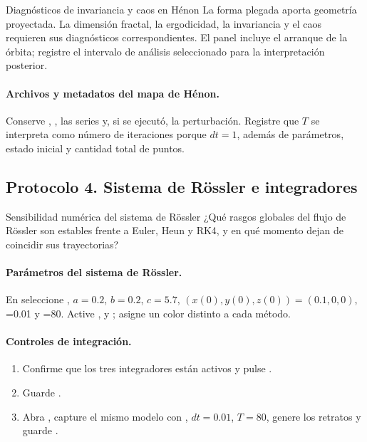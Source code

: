 \begin{cajaalerta}{Diagnósticos de invariancia y caos en Hénon}
La forma plegada aporta geometría proyectada. La dimensión fractal, la ergodicidad,
la invariancia y el caos requieren sus diagnósticos correspondientes. El panel incluye el arranque de la órbita; registre el intervalo de análisis seleccionado para la interpretación posterior.
\end{cajaalerta}

\paragraph{Archivos y metadatos del mapa de Hénon.}
Conserve ,
, las series y, si se ejecutó, la perturbación.
Registre que \(T\) se interpreta como número de iteraciones porque \(dt=1\),
además de parámetros, estado inicial y cantidad total de puntos.

\subsection{Protocolo 4. Sistema de Rössler e integradores}

\begin{cajaazul}{Sensibilidad numérica del sistema de Rössler}
¿Qué rasgos globales del flujo de Rössler son estables frente a Euler, Heun y
RK4, y en qué momento dejan de coincidir sus trayectorias?
\end{cajaazul}

\paragraph{Parámetros del sistema de Rössler.}
En  seleccione ,
\(a=0.2\), \(b=0.2\), \(c=5.7\),
\((x(0),y(0),z(0))=(0.1,0,0)\), =0.01 y
=80. Active ,
 y ; asigne un color
distinto a cada método.

\paragraph{Controles de integración.}
\begin{enumerate}
  \item Confirme que los tres integradores están activos y pulse
  .
  \item Guarde .
  \item Abra , capture el mismo modelo con
  , \(dt=0.01\), \(T=80\), genere los retratos y
  guarde .
\end{enumerate}

